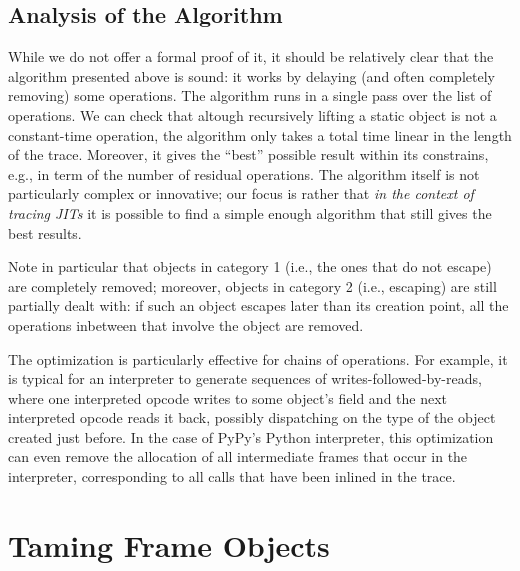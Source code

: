 \documentclass[preprint]{sigplanconf}
\newcommand\ie{i.e.,\xspace}
\newcommand\eg{e.g.,\xspace}
\begin{document}

\subsection{Analysis of the Algorithm}
\label{sub:analysis}

While we do not offer a formal proof of it, it should be relatively clear
that the algorithm presented above is sound: it works by delaying (and
often completely removing) some operations.  The algorithm runs in a
single pass over the list of operations.  We can check that altough
recursively lifting a static object is not a constant-time operation,
the algorithm only takes a total time linear in the length of the trace.
Moreover, it gives the ``best'' possible result within its constrains,
\eg in term of the number of residual operations.  The
algorithm itself is not particularly complex or innovative; our focus is
rather that \emph{in the context of tracing JITs} it is possible to find a
simple enough algorithm that still gives the best results.

Note in particular that objects in category 1 (\ie the ones that do
not escape) are completely removed; moreover, objects in category 2
(\ie escaping) are still partially dealt with: if such an object
escapes later than its creation point, all the operations inbetween that
involve the object are removed.

The optimization is particularly effective for chains of operations.
For example, it is typical for an interpreter to generate sequences of
writes-followed-by-reads, where one interpreted opcode writes to some
object's field and the next interpreted opcode reads it back, possibly
dispatching on the type of the object created just before.  In the case
of PyPy's Python interpreter, this optimization can even remove the
allocation of all intermediate frames that occur in the interpreter,
corresponding to all calls that have been inlined in the trace.





\section{Taming Frame Objects}
\label{sec:frames}
\end{document}
